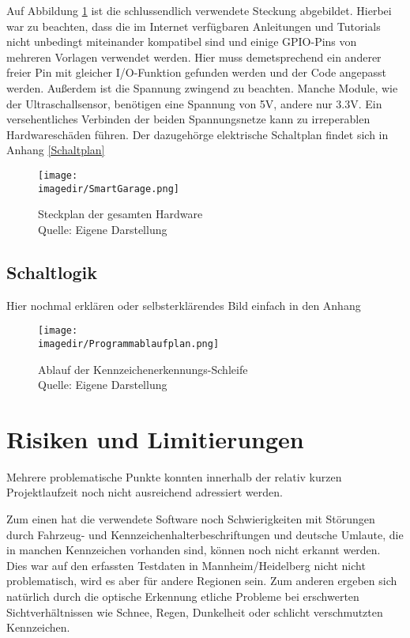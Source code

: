 Auf Abbildung \ref{Steckplansm} ist die schlussendlich verwendete Steckung abgebildet. Hierbei war zu beachten, dass die im Internet verfügbaren Anleitungen und Tutorials nicht unbedingt miteinander kompatibel sind und einige \ac{GPIO}-Pins von mehreren Vorlagen verwendet werden. Hier muss demetsprechend ein anderer freier Pin mit gleicher I/O-Funktion gefunden werden und der Code angepasst werden. Außerdem ist die Spannung zwingend zu beachten. Manche Module, wie der Ultraschallsensor, benötigen eine Spannung von 5V, andere nur 3.3V. Ein versehentliches Verbinden der beiden Spannungsnetze kann zu irreperablen Hardwareschäden führen. 
Der dazugehörge elektrische Schaltplan findet sich in Anhang \ref{Schaltplan}
\begin{figure}[H]
	\centering 
	\label{Steckplansm}
	\texttt{[image: \\imagedir/SmartGarage.png]}
	\captionsetup{format=hang}
	\caption[Steckplan]{\label{Steckplansm}Steckplan der gesamten Hardware \\Quelle: Eigene Darstellung}
\end{figure}\section{Schaltlogik}
Hier nochmal erklären oder selbsterklärendes Bild einfach in den Anhang
\begin{figure}[H]
	\centering 
	\texttt{[image: \\imagedir/Programmablaufplan.png]}
	\captionsetup{format=hang}
	\caption[Programmablauf]{\label{fig:test}Ablauf der Kennzeichenerkennungs-Schleife \\Quelle: Eigene Darstellung}
\end{figure}
\chapter{Risiken und Limitierungen}

Mehrere problematische Punkte konnten innerhalb der relativ kurzen Projektlaufzeit noch nicht ausreichend adressiert werden. 

Zum einen hat die verwendete Software noch Schwierigkeiten mit Störungen durch Fahrzeug- und Kennzeichenhalterbeschriftungen und deutsche Umlaute, die in manchen Kennzeichen vorhanden sind, können noch nicht erkannt werden. Dies war auf den erfassten Testdaten in Mannheim/Heidelberg nicht nicht problematisch, wird es aber für andere Regionen sein.
Zum anderen ergeben sich natürlich durch die optische Erkennung etliche Probleme bei erschwerten Sichtverhältnissen wie Schnee, Regen, Dunkelheit oder schlicht verschmutzten Kennzeichen. 

